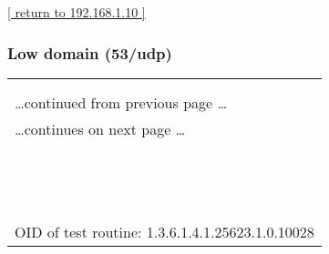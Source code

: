 \documentclass{article}
\begin{document}
\begin{footnotesize}\hyperref[host:192.168.1.10]{[ return to 192.168.1.10 ]}\end{footnotesize}
\subsubsection{Low domain (53/udp)}
\label{port:192.168.1.10 domain (53/udp) Low}

\begin{longtable}{|p{}|}
\hline
\rowcolor{openvas_note}{\color{white}{Low (CVSS: 5.0) }}\\
\rowcolor{openvas_note}{\color{white}{NVT: Determine which version of BIND name daemon is running}}\\
\hline
\endfirsthead
\hfill\ldots continued from previous page \ldots \\
\hline
\endhead
\hline
\ldots continues on next page \ldots \\
\endfoot
\hline
\endlastfoot
\\
\rowcolor{white}{\verb=BIND 'NAMED' is an open-source DNS server from ISC.org.=}\\
\rowcolor{white}{\verb=Many proprietary DNS servers are based on BIND source code.=}\\
\rowcolor{white}{\verb=The BIND based NAMED servers (or DNS servers) allow remote users=}\\
\rowcolor{white}{\verb=to query for version and type information.  The query of the CHAOS=}\\
\rowcolor{white}{\verb=TXT record 'version.bind', will typically prompt the server to send=}\\
\rowcolor{white}{\verb=the information back to the querying source.=}\\
\rowcolor{white}{\verb=The remote bind version is : 9.7.0-P1=}\\
\rowcolor{white}{\verb=Solution :=}\\
\rowcolor{white}{\verb=Using the 'version' directive in the 'options' section will block=}\\
\rowcolor{white}{\verb=the 'version.bind' query, but it will not log such attempts.=}\\
\rowcolor{white}{\verb==}\\
\rowcolor{white}{\verb==}\\
\\
OID of test routine: 1.3.6.1.4.1.25623.1.0.10028\\
\end{longtable}
\end{document}
